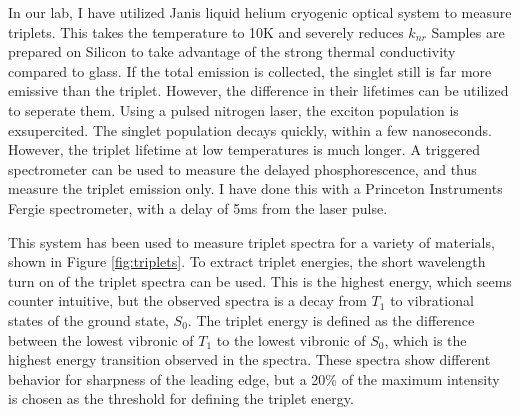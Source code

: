 \documentclass[../thesis.tex]{subfiles}
\begin{document}
In our lab, I have utilized Janis liquid helium cryogenic optical system to measure triplets.
This takes the temperature to 10K and severely reduces $k_{nr}$
Samples are prepared on Silicon to take advantage of the strong thermal conductivity compared to glass.
If the total emission is collected, the singlet still is far more emissive than the triplet.
However, the difference in their lifetimes can be utilized to seperate them.
Using a pulsed nitrogen laser, the exciton population is exsupercited. 
The singlet population decays quickly, within a few nanoseconds.
However, the triplet lifetime at low temperatures is much longer.
A triggered spectrometer can be used to measure the delayed phosphorescence, and thus measure the triplet emission only.
I have done this with a Princeton Instruments Fergie spectrometer, with a delay of 5ms from the laser pulse.

This system has been used to measure triplet spectra for a variety of materials, shown in Figure \ref{fig:triplets}.
To extract triplet energies, the short wavelength turn on of the triplet spectra can be used.  
This is the highest energy, which seems counter intuitive, but the observed spectra is a decay from $T_1$ to vibrational states of the ground state, $S_0$. 
The triplet energy is defined as the difference between the lowest vibronic of $T_1$ to the lowest vibronic of $S_0$, which is the highest energy transition observed in the spectra.
These spectra show different behavior for sharpness of the leading edge, but a 20\% of the maximum intensity is chosen as the threshold for defining the triplet energy.


\end{document}
